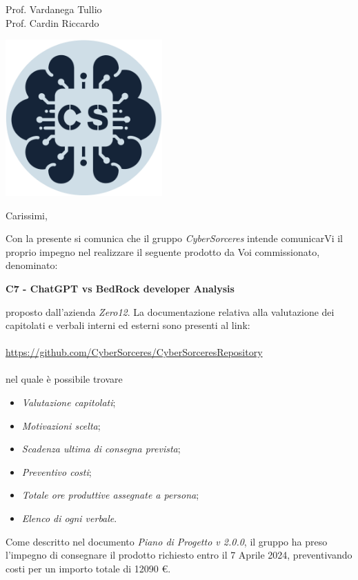 \documentclass[12pt]{letter}
\begin{document}
\begin{letter}
{
	Prof. Vardanega Tullio \\
 	Prof. Cardin Riccardo
}
\begin{center}
  \includegraphics[width=6cm, height=6cm]{documenti/logo rotondo.png}
  \label{fig:immagine}
\end{center}

\opening{Carissimi,}

Con la presente si comunica che il gruppo
\textit{CyberSorceres} intende comunicarVi il proprio 
impegno nel realizzare il seguente prodotto da Voi
commissionato, denominato:

\textbf{C7 - ChatGPT vs BedRock developer Analysis}

proposto dall'azienda \textit{Zero12}.
La documentazione relativa alla valutazione dei capitolati e verbali interni ed esterni sono presenti al link: 	\\ \\
\href{https://github.com/CyberSorceres/CyberSorceresRepository}{https://github.com/CyberSorceres/CyberSorceresRepository} \\ \\
nel quale è possibile trovare
\begin{itemize}
    \item \textit{Valutazione capitolati};
	\item \textit{Motivazioni scelta};
	\item \textit{Scadenza ultima di consegna prevista};
	\item \textit{Preventivo costi};
	\item \textit{Totale ore produttive assegnate a persona};
	\item \textit{Elenco di ogni verbale}.
\end{itemize}

Come descritto nel documento \textit{Piano di Progetto v 2.0.0},
il gruppo ha preso l'impegno di consegnare il prodotto richiesto entro il 7 Aprile 2024, preventivando costi per un importo totale di 12090 €.


\end{letter}
\end{document}

